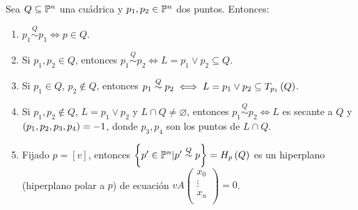 \begin{prop}
  \label{propietats_polaritat}
  Sea $Q \subseteq \mathbb{P}^n$ una cuádrica y $p_1, p_2\in\mathbb{P}^n$ dos puntos. Entonces:
  \begin{enumerate}[(1)]
    \item $p_1 \stackrel{Q}{\sim} p_1 \iff p\in Q$.
    \item Si $p_1,p_2\in Q$, entonces $p_1 \stackrel{Q}{\sim} p_2 \iff L=p_1\vee p_2 \subseteq Q$.
    \item Si $p_1\in Q$, $p_2 \not\in Q$, entonces $p_1 \stackrel{Q}{\sim} p_2 \iff L=p_1\vee p_2 
      \subseteq T_{p_1}\left( Q \right)$.
    \item Si $p_1,p_2\not\in Q$, $ L=p_1\vee p_2$ y $ L\cap Q \neq \varnothing$, entonces
      $p_1 \stackrel{Q}{\sim} p_2 \iff L$ es secante a $Q$ y $\left( p_1,p_2,p_3,p_4\right) =-1$, donde
      $p_3, p_4$ son los puntos de $L \cap Q$. 
    \item Fijado $p=[v]$, entonces $\left\{p'\in\mathbb{P}^n | p' \stackrel{Q}{\sim} p\right\} = H_p\left( Q\right)$
      es un hiperplano (hiperplano polar a $p$) de ecuación $vA\begin{pmatrix}x_0\\ \vdots\\ x_n\\ \end{pmatrix}=0$.
  \end{enumerate}
\end{prop}
